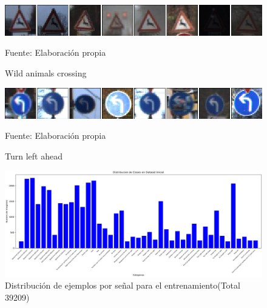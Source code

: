 			\begin{figure}[H]
				\begin{center}
				\includegraphics[width=1\textwidth]{images/desarrollo/imagenes/alemania/1__(32).png}
				\end{center}
				\begin{center}
				\caption{\small{Wild animals crossing}}
				\vskip -0.25cm
				{\small{Fuente: Elaboración propia}}
				\end{center}
				\vspace{-1.5em}
			\end{figure}

			\begin{figure}[H]
				\begin{center}
				\includegraphics[width=1\textwidth]{images/desarrollo/imagenes/alemania/1__(35).png}
				\end{center}
				\begin{center}
				\caption{\small{Turn left ahead}}
				\vskip -0.25cm
				{\small{Fuente: Elaboración propia}}
				\end{center}
				\vspace{-1.5em}
			\end{figure}


			\begin{figure}[H]
				\begin{center}
				\includegraphics[width=1\textwidth, height=1.2\textheight,keepaspectratio]{images/desarrollo/histograms/initial39209}
				\end{center}
				\begin{center}
				\caption{\small{Distribución de ejemplos por señal para el entrenamiento(Total 39209)}}	
				{\small{\fontsize{10}{16.8}\selectfont {Fuente: Elaboración propia}}}
				\end{center}
				\vspace{-1.5em}
			\end{figure}


